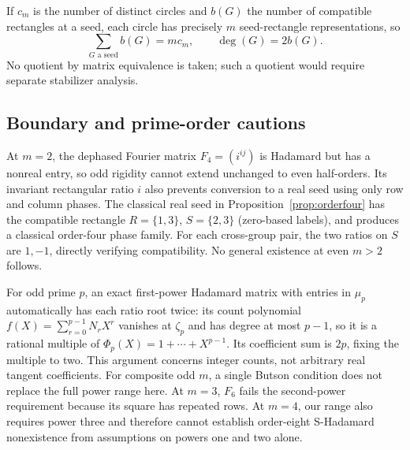 If $c_m$ is the number of distinct circles and $b(G)$ the number of compatible rectangles at a seed, each circle has precisely $m$ seed-rectangle representations, so
\[
 \sum_{G\text{ a seed}}b(G)=mc_m,\qquad\deg(G)=2b(G).
\]
No quotient by matrix equivalence is taken; such a quotient would require separate stabilizer analysis.

\subsection{Boundary and prime-order cautions}
At $m=2$, the dephased Fourier matrix $F_4=(i^{ij})$ is Hadamard but has a nonreal entry, so odd rigidity cannot extend unchanged to even half-orders. Its invariant rectangular ratio $i$ also prevents conversion to a real seed using only row and column phases. The classical real seed in Proposition~\ref{prop:orderfour} has the compatible rectangle $R=\{1,3\}$, $S=\{2,3\}$ (zero-based labels), and produces a classical order-four phase family. For each cross-group pair, the two ratios on $S$ are $1,-1$, directly verifying compatibility. No general existence at even $m>2$ follows.

For odd prime $p$, an exact first-power Hadamard matrix with entries in $\mu_p$ automatically has each ratio root twice: its count polynomial $f(X)=\sum_{r=0}^{p-1}N_rX^r$ vanishes at $\zeta_p$ and has degree at most $p-1$, so it is a rational multiple of $\Phi_p(X)=1+\cdots+X^{p-1}$. Its coefficient sum is $2p$, fixing the multiple to two. This argument concerns integer counts, not arbitrary real tangent coefficients. For composite odd $m$, a single Butson condition does not replace the full power range here. At $m=3$, $F_6$ fails the second-power requirement because its square has repeated rows. At $m=4$, our range also requires power three and therefore cannot establish order-eight S-Hadamard nonexistence from assumptions on powers one and two alone.
